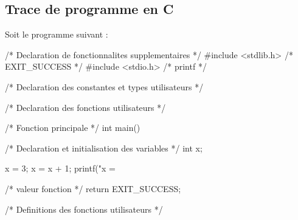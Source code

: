 \subsection{Trace de programme en C}

Soit le programme suivant :
\begin{listing}{1}
/* Declaration de fonctionnalites supplementaires */
#include <stdlib.h> /* EXIT_SUCCESS */
#include <stdio.h> /* printf */

/* Declaration des constantes et types utilisateurs */

/* Declaration des fonctions utilisateurs */

/* Fonction principale */
int main()
{
    /* Declaration et initialisation des variables */
    int x;

    x = 3;
    x = x + 1;
    printf("x = %

    /* valeur fonction */
    return EXIT_SUCCESS;
}

/* Definitions des fonctions utilisateurs */
  
\end{listing}

